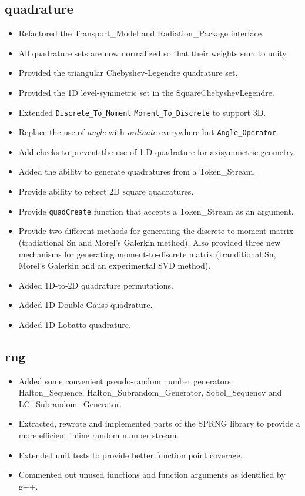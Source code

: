 \documentclass[note]{ResearchNote}
\begin{document}
\subsection{quadrature}
\label{changes:quadrature}
\begin{itemize}
\item Refactored the \textsf{Transport\_Model} and
  \textsf{Radiation\_Package} interface.
\item All quadrature sets are now normalized so that their weights sum
  to unity.
\item Provided the triangular Chebyshev-Legendre quadrature set.
\item Provided the 1D level-symmetric set in the
  \textsf{SquareChebyshevLegendre}. 
\item Extended \texttt{Discrete\_To\_Moment}
  \texttt{Moment\_To\_Discrete} to support 3D.
\item Replace the use of {\it angle} with {\it ordinate} everywhere
  but \texttt{Angle\_Operator}.
\item Add checks to prevent the use of 1-D quadrature for axisymmetric
  geometry. 
\item Added the ability to generate quadratures from a
  \textsf{Token\_Stream}. 
\item Provide ability to reflect 2D square quadratures.
\item Provide \texttt{quadCreate} function that accepts a
  \textsf{Token\_Stream} as an argument.  
\item Provide two different methods for generating the
  discrete-to-moment matrix (tradiational Sn and Morel's Galerkin
  method).  Also provided three new mechanisms for generating
  moment-to-discrete matrix (tranditional Sn, Morel's Galerkin and an
  experimental SVD method).
\item Added 1D-to-2D quadrature permutations.
\item Added 1D Double Gauss quadrature.
\item Added 1D Lobatto quadrature.
\end{itemize}

\subsection{rng}
\label{changes:rng}
\begin{itemize}
\item Added some convenient pseudo-random number generators:
  \textsf{Halton\_Sequence}, \textsf{Halton\_Subrandom\_Generator},
  \textsf{Sobol\_Sequency} and \textsf{LC\_Subrandom\_Generator}.
\item Extracted, rewrote and implemented parts of the SPRNG library to
  provide a more efficient inline random number stream.
\item Extended unit tests to provide better function point coverage.
\item Commented out unused functions and function arguments as
  identified by g++.
\end{itemize}
\end{document}
